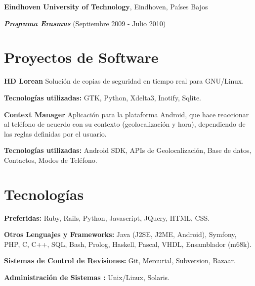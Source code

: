 \documentclass[margin,line]{resume}
\begin{document}
\begin{resume}
{\bf Eindhoven University of Technology}, Eindhoven, Países Bajos\\
\vspace*{-.1in}
\begin{list1}
\item[] {\bf \em Programa Erasmus} (Septiembre 2009 - Julio 2010) 
\end{list1}

\section{\sc Proyectos de Software } 
\begin{list1}
\item[] {\bf HD Lorean}
Solución de copias de seguridad en tiempo real para GNU/Linux.
\vspace*{.05in}
\begin{list2}
\item {\bf Tecnologías utilizadas:} GTK, Python, Xdelta3, Inotify, Sqlite.\\
\end{list2} 

\item[] {\bf Context Manager}
Aplicación para la plataforma Android, que hace reaccionar al teléfono de acuerdo con su contexto (geolocalización y hora), dependiendo de las reglas definidas por el usuario.
\vspace*{-.13in}
\begin{list2}
\item {\bf Tecnologías utilizadas:} Android SDK, APIs de Geolocalización, Base de datos,
Contactos, Modos de Teléfono.
\end{list2}
\end{list1}

\section{\sc Tecnologías} 
\begin{list1}
\item[]{\bf Preferidas:} Ruby, Rails, Python, Javascript, JQuery, HTML, CSS. 
\item[]{\bf Otros Lenguajes y Frameworks:} Java (J2SE, J2ME, Android), Symfony, PHP, C, C++, SQL, Bash, Prolog, Haskell, Pascal, VHDL, Ensamblador (m68k).
\item[]{\bf Sistemas de Control de Revisiones:} Git, Mercurial, Subversion, Bazaar.
\item[]{\bf Administración de Sistemas :} Unix/Linux, Solaris.
\end{list1}


\end{resume}
\end{document}
